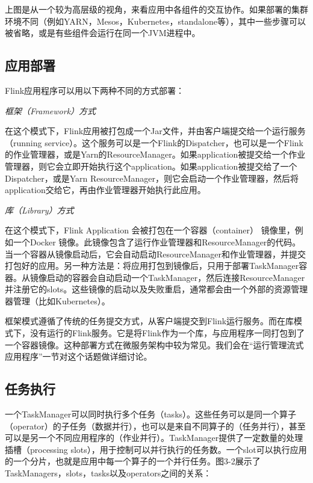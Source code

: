 \documentclass[cn,11pt,chinese]{elegantbook}
\begin{document}
\begin{note}
    上图是从一个较为高层级的视角，来看应用中各组件的交互协作。如果部署的集群环境不同（例如YARN，Mesos，Kubernetes，standalone等），其中一些步骤可以被省略，或是有些组件会运行在同一个JVM进程中。
\end{note}

\subsection{应用部署}

Flink应用程序可以用以下两种不同的方式部署：

\textit{框架（Framework）方式}

在这个模式下，Flink应用被打包成一个Jar文件，并由客户端提交给一个运行服务（running service）。这个服务可以是一个Flink的Dispatcher，也可以是一个Flink的作业管理器，或是Yarn的ResourceManager。如果application被提交给一个作业管理器，则它会立即开始执行这个application。如果application被提交给了一个Dispatcher，或是Yarn ResourceManager，则它会启动一个作业管理器，然后将application交给它，再由作业管理器开始执行此应用。

\textit{库（Library）方式}

在这个模式下，Flink Application 会被打包在一个容器（container） 镜像里，例如一个Docker 镜像。此镜像包含了运行作业管理器和ResourceManager的代码。当一个容器从镜像启动后，它会自动启动ResourceManager和作业管理器，并提交打包好的应用。另一种方法是：将应用打包到镜像后，只用于部署TaskManager容器。从镜像启动的容器会自动启动一个TaskManager，然后连接ResourceManager并注册它的slots。这些镜像的启动以及失败重启，通常都会由一个外部的资源管理器管理（比如Kubernetes）。

框架模式遵循了传统的任务提交方式，从客户端提交到Flink运行服务。而在库模式下，没有运行的Flink服务。它是将Flink作为一个库，与应用程序一同打包到了一个容器镜像。这种部署方式在微服务架构中较为常见。我们会在“运行管理流式应用程序”一节对这个话题做详细讨论。

\subsection{任务执行}

一个TaskManager可以同时执行多个任务（tasks）。这些任务可以是同一个算子（operator）的子任务（数据并行），也可以是来自不同算子的（任务并行），甚至可以是另一个不同应用程序的（作业并行）。TaskManager提供了一定数量的处理插槽（processing slots），用于控制可以并行执行的任务数。一个slot可以执行应用的一个分片，也就是应用中每一个算子的一个并行任务。图3-2展示了TaskManagers，slots，tasks以及operators之间的关系：
\end{document}
